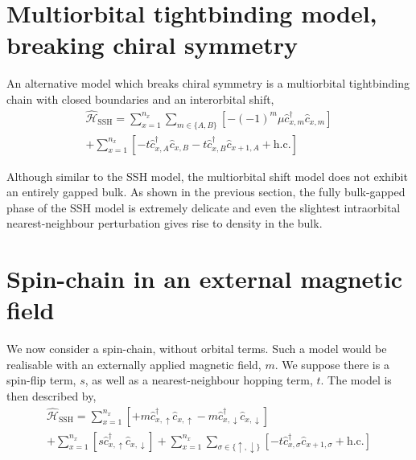 
\section{\label{sec:multiorbital_chain} Multiorbital tightbinding model, breaking chiral symmetry}
An alternative model which breaks chiral symmetry is a multiorbital tightbinding 
chain with closed boundaries and an interorbital shift,
\begin{multline}
    \hat{\mathcal H}_\text{SSH} =  
    \sum_{x=1}^{n_x} \sum_{m\in\{A,B\}} 
    \left[
        -(-1)^m\mu \hat c_{x, m}^\dagger \hat c_{x, m}
\right]\\
    +
    \sum_{x=1}^{n_x}
    \left[
    -t \hat c_{x, A}^\dagger \hat c_{x, B}
    -t \hat c_{x, B}^\dagger \hat c_{x+1, A}
    +\text{h.c.}
    \right]
\label{eq:multiorbital_chain}
\end{multline}


Although similar to the SSH model, the multiorbital shift model does not exhibit 
an entirely gapped bulk. 
As shown in the previous section, the fully bulk-gapped phase of the 
SSH model is extremely delicate and even the slightest intraorbital nearest-neighbour
perturbation gives rise to density in the bulk.

\section{\label{sec:spin_chain} Spin-chain in an external magnetic field}
We now consider a spin-chain, without orbital terms. Such a model would be 
realisable with an externally applied magnetic field, $m$. 
We suppose there is a spin-flip term, $s$, as well as a nearest-neighbour hopping term, $t$. The model is then described by,
\begin{multline}
    \hat{\mathcal H}_\text{SSH} =  
    \sum_{x=1}^{n_x} 
    \left[
        +m\hat c_{x, \uparrow}^\dagger \hat c_{x, \uparrow}
        -m\hat c_{x, \downarrow}^\dagger \hat c_{x, \downarrow}
\right]\\
    +
    \sum_{x=1}^{n_x}
    \left[
    s\hat c_{x, \uparrow}^\dagger \hat c_{x, \downarrow}
    \right]
    +
    \sum_{x=1}^{n_x}
    \sum_{\sigma\in\{\uparrow,\downarrow\}} 
    \left[
    -t \hat c_{x, \sigma}^\dagger \hat c_{x+1, \sigma}
    +\text{h.c.}
    \right]
\label{eq:spin-chain}
\end{multline}

